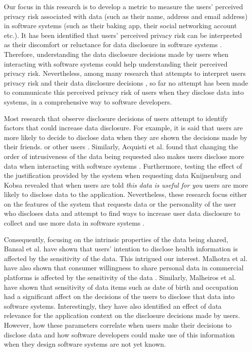 \documentclass[10pt]{article}
\begin{document}
Our focus in this research is to develop a metric to measure the users' perceived privacy risk associated with data (such as their name, address and email address) in software systems (such as their baking app, their social networking account etc.). It has been identified that users' perceived privacy risk can be interpreted as their discomfort or reluctance for data disclosure in software systems \cite {kobsa2007privacy, li2010understanding, malhotra2004internet}. Therefore, understanding the data disclosure decisions made by users when interacting with software systems could help understanding their perceived privacy risk. Nevertheless, among many research that attempts to interpret users privacy risk and their data disclosure decisions \cite {knijnenburg2013making, li2010understanding, wang2016context, malheiros2013fairly, dennett2000little}, so far no attempt has been made to communicate this perceived privacy risk of users when they disclose data into systems, in a comprehensive way to software developers. 

Most research that observe disclosure decisions of users attempt to identify factors that could increase data disclosure. For example, it is said that users are more likely to decide to disclose data when they are shown the decisions made by their friends. \cite {dennett2000little} or other users \cite {besmer2010impact}. Similarly, Acquisti et al. found that changing the order of intrusiveness of the data being requested also makes users disclose more data when interacting with software systems \cite {acquisti2012impact}. Furthermore, testing the effect of the justification provided by the system when requesting data Knijnenburg and Kobsa \cite {knijnenburg2013helping} revealed that when users are told \textit{this data is useful for you} users are more likely to disclose data to the application. Nevertheless, these research focus either on the features of the system that requests data \cite {li2010understanding, wang2016context, malheiros2013fairly} or the personality of the user who discloses data \cite {nissenbaum2009privacy} and attempt to find ways to increase user data disclosure to collect and use more data in software systems \cite {dennett2000little}. 

Consequently, focusing on the intrinsic properties of the data being shared, Bansal et al. have shown that users' intention to disclose health information is affected by the sensitivity of the data\cite {bansal2010impact}. This intrigued our interest. Malhotra et al. have also shown that consumer willingness to share personal data in commercial platforms is affected by the sensitivity of the data \cite {malhotra2004internet}. Similarly, Malheiros et al. \cite {malheiros2013fairly} have shown that sensitivity of data items such as date of birth and occupation had a significant affect on the decisions of the users to disclose that data into software systems. Interestingly, they have also identified an effect of data relevance for the application context on the disclosure decisions made by users. However, how these parameters correlate when users make their decisions to disclose data and how software developers could make use of this information when they design software systems are not yet known.
\end{document}
